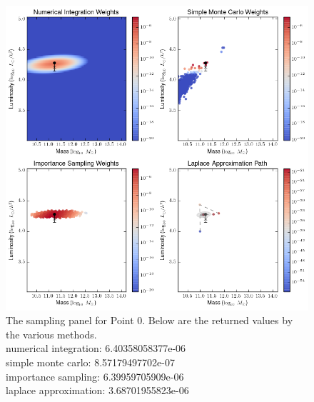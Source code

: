 \documentclass[\docopts]{\docclass}
\begin{document}
\begin{figure}[!h]
\centering
\includegraphics[width=0.9\columnwidth]{point1.png}
\caption{
The sampling panel for Point 0. Below are the returned values by the various methods.\\
numerical integration: 6.40358058377e-06\\
simple monte carlo: 8.57179497702e-07\\
importance sampling: 6.39959705909e-06\\
laplace approximation: 3.68701955823e-06\\
\label{fig:point1}}
\end{figure}
\end{document}
